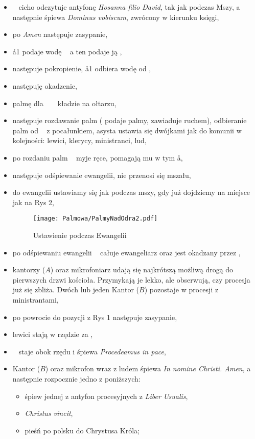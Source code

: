 		\begin{itemize}
			\item \ii~ cicho odczytuje antyfonę \textit{Hosanna filio David}, tak jak podczas Mszy, a następnie śpiewa \textit{Dominus vobiscum}, zwrócony w kierunku księgi,
			\item po \textit{Amen} następuje zasypanie, 
			\item \aa1 podaje wodę \cc~ a ten podaje ją \dd,
			\item następuje pokropienie, \aa1 odbiera wodę od \dd,
			\item następuję okadzenie,
			\item palmę dla \ii~ \dd~ kładzie na ołtarzu,
			\item następuje rozdawanie palm ( podaje palmy,  zawiaduje ruchem), odbieranie palm od \ii~ z pocałunkiem, asysta ustawia się dwójkami jak do komunii w kolejności: lewici, klerycy, ministranci, lud,
			\item po rozdaniu palm \ii~ myje ręce, pomagają mu w tym \aa,
			\item następuje odśpiewanie ewangelii, nie przenosi się mszału,
			\item do ewangelii ustawiamy się jak podczas mszy, gdy już dojdziemy na miejsce jak na Rys 2, 
	
		\begin{figure}[h!]
			\centering
			\texttt{[image: Palmowa/PalmyNadOdra2.pdf]}
			\caption{Ustawienie podczas Ewangelii}
		\end{figure}
		
			\item po odśpiewaniu ewangelii \ii~ całuje ewangeliarz oraz jest okadzany przez \dd,
			\item kantorzy ($A$) oraz mikrofoniarz udają się najkrótszą możliwą drogą do pierwszych drzwi kościoła. Przymykają je lekko, ale obserwują, czy procesja już się zbliża. Dwóch lub jeden Kantor ($B$) pozostaje w procesji z ministrantami,
			\item po powrocie do pozycji z Rys 1 następuje zasypanie,
			\item lewici stają w rzędzie za	\ii,
			\item \dd~ staje obok rzędu i śpiewa \textit{Procedeamus in pace},
			\item Kantor ($B$) oraz mikrofon wraz z ludem śpiewa \textit{In nomine Christi. Amen}, a następnie rozpocznie jedno z poniższych: 
			
			\begin{itemize}
				\item śpiew jednej z antyfon procesyjnych z \textit{Liber Usualis},
				\item \textit{Christus vincit},
				\item pieśń po polsku do Chrystusa Króla;
			\end{itemize}


\end{itemize}
